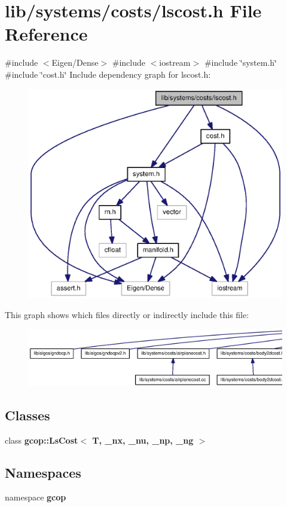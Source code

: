 \section{lib/systems/costs/lscost.h \-File \-Reference}
\label{lscost_8h}
{\ttfamily \#include $<$\-Eigen/\-Dense$>$}\*
{\ttfamily \#include $<$iostream$>$}\*
{\ttfamily \#include \char`\"{}system.\-h\char`\"{}}\*
{\ttfamily \#include \char`\"{}cost.\-h\char`\"{}}\*
\-Include dependency graph for lscost.\-h\-:\nopagebreak
\begin{figure}[H]
\begin{center}
\leavevmode
\includegraphics[width=350pt]{lscost_8h__incl}
\end{center}
\end{figure}
\-This graph shows which files directly or indirectly include this file\-:\nopagebreak
\begin{figure}[H]
\begin{center}
\leavevmode
\includegraphics[width=350pt]{lscost_8h__dep__incl}
\end{center}
\end{figure}
\subsection*{\-Classes}
\begin{DoxyCompactItemize}
\item 
class {\bf gcop\-::\-Ls\-Cost$<$ T, \-\_\-nx, \-\_\-nu, \-\_\-np, \-\_\-ng $>$}
\end{DoxyCompactItemize}
\subsection*{\-Namespaces}
\begin{DoxyCompactItemize}
\item 
namespace {\bf gcop}
\end{DoxyCompactItemize}
